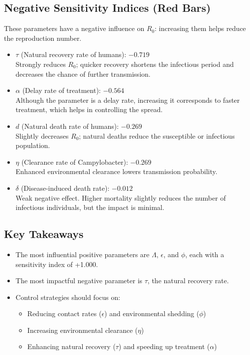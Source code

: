 \documentclass[a4paper,12pt]{report}
\begin{document}
\begin{itemize}
\subsection*{Negative Sensitivity Indices (Red Bars)}
These parameters have a negative influence on \( R_0 \): increasing them helps reduce the reproduction number.
\begin{itemize}[label=--]
    \item \(\tau\) (Natural recovery rate of humans): \(-0.719\) \\
    Strongly reduces \( R_0 \); quicker recovery shortens the infectious period and decreases the chance of further transmission.
    
    \item \(\alpha\) (Delay rate of treatment): \(-0.564\) \\
    Although the parameter is a delay rate, increasing it corresponds to faster treatment, which helps in controlling the spread.
    
    \item \(d\) (Natural death rate of humans): \(-0.269\) \\
    Slightly decreases \( R_0 \); natural deaths reduce the susceptible or infectious population.
    
    \item \(\eta\) (Clearance rate of Campylobacter): \(-0.269\) \\
    Enhanced environmental clearance lowers transmission probability.
    
    \item \(\delta\) (Disease-induced death rate): \(-0.012\) \\
    Weak negative effect. Higher mortality slightly reduces the number of infectious individuals, but the impact is minimal.
\end{itemize}

\subsection*{Key Takeaways}
\begin{itemize}
    \item The most influential positive parameters are \(\Lambda\), \(\epsilon\), and \(\phi\), each with a sensitivity index of +1.000.
    \item The most impactful negative parameter is \(\tau\), the natural recovery rate.
    \item Control strategies should focus on:
    \begin{itemize}
        \item Reducing contact rates (\(\epsilon\)) and environmental shedding (\(\phi\))
        \item Increasing environmental clearance (\(\eta\))
        \item Enhancing natural recovery (\(\tau\)) and speeding up treatment (\(\alpha\))
    \end{itemize}
\end{itemize}


\end{itemize}
\end{document}
